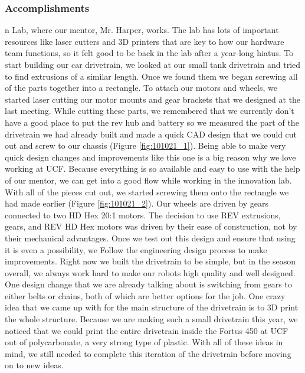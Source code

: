 \subsubsection*{Accomplishments}
n Lab, where our mentor, Mr. Harper, works. The lab has lots of important resources like laser cutters and 3D printers that are key to how our hardware team functions, so it felt good to be back in the lab after a year-long hiatus. To start building our car drivetrain, we looked at our small tank drivetrain and tried to find extrusions of a similar length. Once we found them we began screwing all of the parts together into a rectangle. To attach our motors and wheels, we started laser cutting our motor mounts and gear brackets that we designed at the last meeting. While cutting these parts, we remembered that we currently don’t have a good place to put the rev hub and battery so we measured the part of the drivetrain we had already built and made a quick CAD design that we could cut out and screw to our chassis (Figure \ref{fig:101021_1}). Being able to make very quick design changes and improvements like this one is a big reason why we love working at UCF. Because everything is so available and easy to use with the help of our mentor, we can get into a good flow while working in the innovation lab. 
With all of the pieces cut out, we started screwing them onto the rectangle we had made earlier (Figure \ref{fig:101021_2}). Our wheels are driven by gears connected to two HD Hex 20:1 motors. The decision to use REV extrusions, gears, and REV HD Hex motors was driven by their ease of construction, not by their mechanical advantages. Once we test out this design and ensure that using it is even a possibility, we Follow the engineering design process to make improvements. Right now we built the drivetrain to be simple, but in the season overall, we always work hard to make our robots high quality and well designed. One design change that we are already talking about is switching from gears to either belts or chains, both of which are better options for the job. One crazy idea that we came up with for the main structure of the drivetrain is to 3D print the whole structure. Because we are making such a small drivetrain this year, we noticed that we could print the entire drivetrain inside the Fortus 450 at UCF out of polycarbonate, a very strong type of plastic. With all of these ideas in mind, we still needed to complete this iteration of the drivetrain before moving on to new ideas. 


